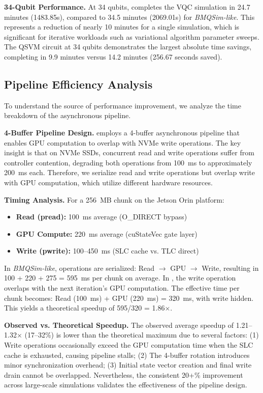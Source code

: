 \noindent\textbf{34-Qubit Performance.}
At 34 qubits, \EdgeQuantum completes the VQC simulation in 24.7 minutes (1483.85s), compared to 34.5 minutes (2069.01s) for \textit{BMQSim-like}.
This represents a reduction of nearly 10 minutes for a single simulation, which is significant for iterative workloads such as variational algorithm parameter sweeps.
The QSVM circuit at 34 qubits demonstrates the largest absolute time savings, completing in 9.9 minutes versus 14.2 minutes (256.67 seconds saved).



\subsection{Pipeline Efficiency Analysis}
\label{sec:pipeline}

To understand the source of performance improvement, we analyze the time breakdown of the asynchronous pipeline.

\noindent\textbf{4-Buffer Pipeline Design.}
\EdgeQuantum employs a 4-buffer asynchronous pipeline that enables GPU computation to overlap with NVMe write operations.
The key insight is that on NVMe SSDs, concurrent read and write operations suffer from controller contention, degrading both operations from 100~ms to approximately 200~ms each.
Therefore, we serialize read and write operations but overlap write with GPU computation, which utilize different hardware resources.

\noindent\textbf{Timing Analysis.}
For a 256~MB chunk on the Jetson Orin platform:
\begin{itemize}
    \item \textbf{Read (pread):} 100~ms average (O\_DIRECT bypass)
    \item \textbf{GPU Compute:} 220~ms average (cuStateVec gate layer)
    \item \textbf{Write (pwrite):} 100--450~ms (SLC cache vs. TLC direct)
\end{itemize}

In \textit{BMQSim-like}, operations are serialized: Read $\rightarrow$ GPU $\rightarrow$ Write, resulting in 100 + 220 + 275 = 595~ms per chunk on average.
In \EdgeQuantum, the write operation overlaps with the next iteration's GPU computation.
The effective time per chunk becomes: Read (100~ms) + GPU (220~ms) = 320~ms, with write hidden.
This yields a theoretical speedup of 595/320 = 1.86$\times$.

\noindent\textbf{Observed vs. Theoretical Speedup.}
The observed average speedup of 1.21--1.32$\times$ (17--32\%) is lower than the theoretical maximum due to several factors:
(1) Write operations occasionally exceed the GPU computation time when the SLC cache is exhausted, causing pipeline stalls;
(2) The 4-buffer rotation introduces minor synchronization overhead;
(3) Initial state vector creation and final write drain cannot be overlapped.
Nevertheless, the consistent 20+\% improvement across large-scale simulations validates the effectiveness of the pipeline design.



